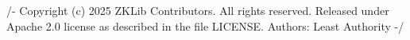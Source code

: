 /-
Copyright (c) 2025 ZKLib Contributors. All rights reserved.
Released under Apache 2.0 license as described in the file LICENSE.
Authors: Least Authority
-/






